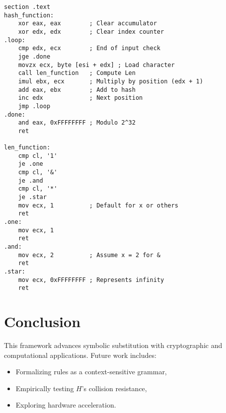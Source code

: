 \documentclass{article}
\begin{document}
\begin{lstlisting}
section .text
hash_function:
    xor eax, eax        ; Clear accumulator
    xor edx, edx        ; Clear index counter
.loop:
    cmp edx, ecx        ; End of input check
    jge .done
    movzx ecx, byte [esi + edx] ; Load character
    call len_function   ; Compute Len
    imul ebx, ecx       ; Multiply by position (edx + 1)
    add eax, ebx        ; Add to hash
    inc edx             ; Next position
    jmp .loop
.done:
    and eax, 0xFFFFFFFF ; Modulo 2^32
    ret

len_function:
    cmp cl, '1'
    je .one
    cmp cl, '&'
    je .and
    cmp cl, '*'
    je .star
    mov ecx, 1          ; Default for x or others
    ret
.one:
    mov ecx, 1
    ret
.and:
    mov ecx, 2          ; Assume x = 2 for &
    ret
.star:
    mov ecx, 0xFFFFFFFF ; Represents infinity
    ret
\end{lstlisting}


\section{Conclusion}
This framework advances symbolic substitution with cryptographic and computational applications. Future work includes:
\begin{itemize}
    \item Formalizing rules as a context-sensitive grammar,
    \item Empirically testing $H$’s collision resistance,
    \item Exploring hardware acceleration.
\end{itemize}
\end{document}

